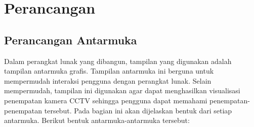 \chapter{Perancangan}

\section{Perancangan Antarmuka}
Dalam perangkat lunak yang dibangun, tampilan yang digunakan adalah tampilan antarmuka grafis. Tampilan antarmuka ini berguna untuk mempermudah interaksi pengguna dengan perangkat lunak. Selain mempermudah, tampilan ini digunakan agar dapat menghasilkan visualisasi penempatan kamera CCTV sehingga pengguna dapat memahami penempatan-penempatan tersebut. Pada bagian ini akan dijelaskan bentuk dari setiap antarmuka. Berikut bentuk antarmuka-antarmuka tersebut:

